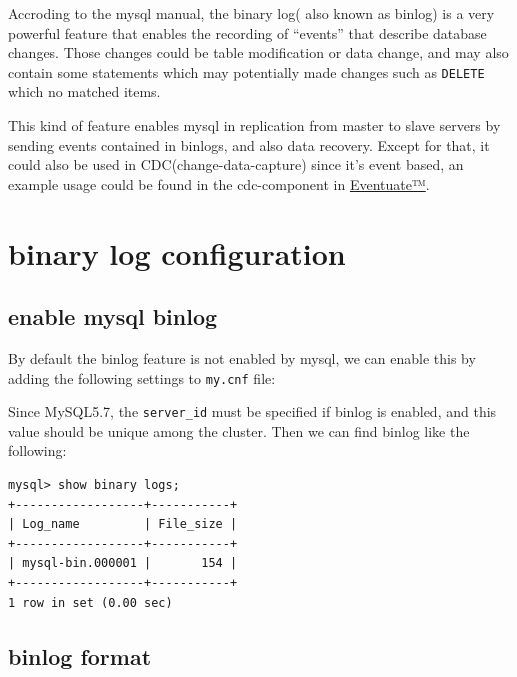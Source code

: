 \documentclass[12pt]{article}
\begin{document}
\makeblogtitle

Accroding to the mysql manual, the binary log( also known as binlog) is a very powerful feature that enables the recording of ``events'' that describe database changes. Those changes could be table modification or data change, and may also contain some statements which may potentially made changes such as \texttt{DELETE} which no matched items.

This kind of feature enables mysql in replication from master to slave servers by sending events contained in binlogs, and also data recovery. Except for that, it could also be used in CDC(change-data-capture) since it's event based, an example usage could be found in the cdc-component in \href{https://eventuate.io/}{Eventuate™}.

\section{binary log configuration}\label{binary-log-configuration}

\subsection{enable mysql binlog}\label{enable-mysql-binlog}

By default the binlog feature is not enabled by mysql, we can enable this by adding the following settings to \texttt{my.cnf} file:

\begin{Shaded}
\begin{Highlighting}[]
\KeywordTok{[mysqld]}
\OtherTok{=}
\OtherTok{=}
\end{Highlighting}
\end{Shaded}

Since MySQL5.7, the \texttt{server\_id} must be specified if binlog is enabled, and this value should be unique among the cluster. Then we can find binlog like the following:

\begin{verbatim}
mysql> show binary logs;
+------------------+-----------+
| Log_name         | File_size |
+------------------+-----------+
| mysql-bin.000001 |       154 |
+------------------+-----------+
1 row in set (0.00 sec)
\end{verbatim}

\subsection{binlog format}\label{binlog-format}
\end{document}
